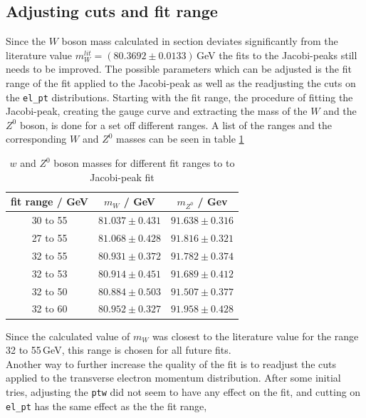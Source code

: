 \subsection{Adjusting cuts and fit range}
    \label{sec:adjusting}
    Since the $W$ boson mass calculated in section \label{sec:gauge_curves} deviates significantly from the literature value $m_W^{lit} = (80.3692 \pm 0.0133)$\,GeV \cite{PDG2024}
    the fits to the Jacobi-peaks still needs to be improved. The possible parameters which can be adjusted is the fit range of the fit applied to the Jacobi-peak 
    as well as the readjusting the cuts on the \texttt{el\_pt} distributions.
    Starting with the fit range, the procedure of fitting the Jacobi-peak, creating the gauge curve and extracting the mass of the $W$ and the $Z^0$ boson, is done 
    for a set off different ranges. A list of the ranges and the corresponding $W$ and $Z^0$ masses can be seen in table \ref{tab:ranges}
    \begin{table}[H]
        \centering
        \begin{tabular}{ccc}
            \toprule
            fit range / GeV & $m_W$ / GeV & $m_{Z^0}$ / Gev \\
            \midrule
            30 to 55    & $81.037 \pm 0.431$  &  $91.638 \pm 0.316$ \\
            27 to 55    & $81.068 \pm 0.428$  &  $91.816 \pm 0.321$ \\
            32 to 55    & $80.931 \pm 0.372$  &  $91.782 \pm 0.374$ \\
            32 to 53    & $80.914 \pm 0.451$  &  $91.689 \pm 0.412$ \\
            32 to 50    & $80.884 \pm 0.503$  &  $91.507 \pm 0.377$ \\
            32 to 60    & $80.952 \pm 0.327$  &  $91.958 \pm 0.428$ \\
            \bottomrule
        \end{tabular}
        \caption{$w$ and $Z^0$ boson masses for different fit ranges to to Jacobi-peak fit}
        \label{tab:ranges}
    \end{table}
    Since the calculated value of $m_W$ was closest to the literature value for the range 32 to 55\,GeV, this range is chosen for all future fits.\\
    Another way to further increase the quality of the fit is to readjust the cuts applied to the transverse electron momentum distribution.
    After some initial tries, adjusting the \texttt{ptw} did not seem to have any effect on the fit, and cutting on \texttt{el\_pt} has the same effect as the the fit range,
